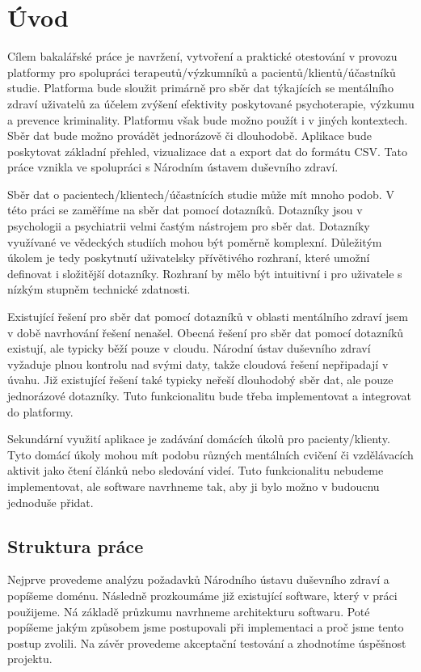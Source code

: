 \chapter*{Úvod}

Cílem bakalářské práce je navržení, vytvoření a praktické otestování v provozu platformy pro spolupráci terapeutů/výzkumníků a pacientů/klientů/účastníků studie.
Platforma bude sloužit primárně pro sběr dat týkajících se mentálního zdraví uživatelů za účelem zvýšení efektivity poskytované psychoterapie, výzkumu a prevence kriminality.
Platformu však bude možno použít i v jiných kontextech.
Sběr dat bude možno provádět jednorázově či dlouhodobě.
Aplikace bude poskytovat základní přehled, vizualizace dat a export dat do formátu CSV\@.
Tato práce vznikla ve spolupráci s Národním ústavem duševního zdraví.

Sběr dat o pacientech/klientech/účastnících studie může mít mnoho podob.
V této práci se zaměříme na sběr dat pomocí dotazníků. 
Dotazníky jsou v psychologii a psychiatrii velmi častým nástrojem pro sběr dat. 
Dotazníky využívané ve vědeckých studiích mohou být poměrně komplexní.
Důležitým úkolem je tedy poskytnutí uživatelsky přívětivého rozhraní, které umožní definovat i složitější dotazníky.
Rozhraní by mělo být intuitivní i pro uživatele s nízkým stupněm technické zdatnosti.

Existující řešení pro sběr dat pomocí dotazníků v oblasti mentálního zdraví jsem v době navrhování řešení nenašel. 
Obecná řešení pro sběr dat pomocí dotazníků existují, ale typicky běží pouze v cloudu. 
Národní ústav duševního zdraví vyžaduje plnou kontrolu nad svými daty, takže cloudová řešení nepřipadají v úvahu. 
Již existující řešení také typicky neřeší dlouhodobý sběr dat, ale pouze jednorázové dotazníky. 
Tuto funkcionalitu bude třeba implementovat a integrovat do platformy.

Sekundární využití aplikace je zadávání domácích úkolů pro pacienty/klienty.
Tyto domácí úkoly mohou mít podobu různých mentálních cvičení či vzdělávacích aktivit jako čtení článků nebo sledování videí.
Tuto funkcionalitu nebudeme implementovat, ale software navrhneme tak, aby ji bylo možno v budoucnu jednoduše přidat.

\section*{Struktura práce}\label{sec:struktura-prace}

Nejprve provedeme analýzu požadavků Národního ústavu duševního zdraví a popíšeme doménu.
Následně prozkoumáme již existující software, který v práci použijeme. 
Ná základě průzkumu navrhneme architekturu softwaru.
Poté popíšeme jakým způsobem jsme postupovali při implementaci a proč jsme tento postup zvolili.
Na závěr provedeme akceptační testování a zhodnotíme úspěšnost projektu.